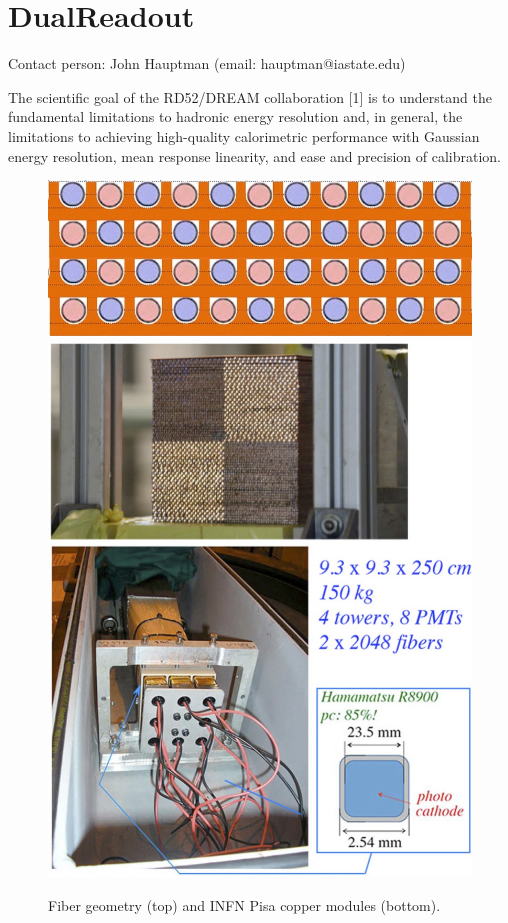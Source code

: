 \section{DualReadout}
Contact person: John Hauptman (email:  hauptman@iastate.edu)


The scientific goal of the RD52/DREAM collaboration [1] is to understand the fundamental limitations
to hadronic energy resolution and, in general, the limitations to achieving high-quality calorimetric
performance with Gaussian energy resolution, mean response linearity, and ease and precision of calibration.

\begin{figure}
 \centering
 \includegraphics[scale=0.26]{Calorimeter/DualReadout/f32-fibers.jpg}
  \includegraphics[scale=0.26]{Calorimeter/DualReadout/f33-pisa-module.jpg}
   \label{fig:pisa}
 \caption{Fiber geometry (top) and INFN Pisa copper modules (bottom).}
\end{figure}


